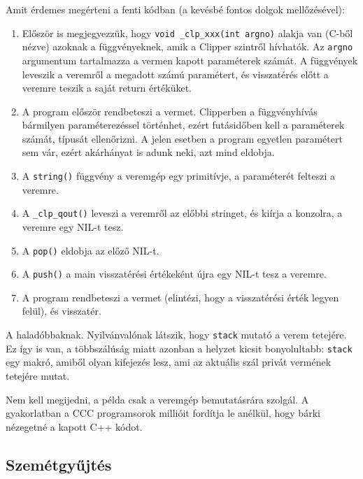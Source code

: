 Amit érdemes megérteni a fenti kódban (a kevésbé fontos dolgok mellőzésével):
\begin{enumerate}
\item 
   Először is megjegyezzük, hogy  \verb!void _clp_xxx(int argno)!
   alakja van (C-ből nézve) azoknak a függvényeknek, amik a Clipper
   szintről hívhatók. Az \verb!argno! argumentum tartalmazza 
   a vermen kapott  paraméterek számát. A függvények leveszik 
   a veremről a megadott számú paramétert, és visszatérés előtt
   a veremre teszik a saját return értéküket.
\item 
   A program először rendbeteszi a vermet. 
   Clipperben a függvényhívás 
   bármilyen paraméterezéssel történhet, ezért futásidőben
   kell a paraméterek számát, típusát ellenőrizni.
   A jelen esetben a program egyetlen paramétert sem vár, 
   ezért akárhányat is adunk neki, azt mind eldobja.
\item 
   A \verb!string()! függvény a veremgép egy primitívje,
   a paraméterét felteszi a veremre.
\item 
   A \verb!_clp_qout()! leveszi a veremről az előbbi stringet,
   és kiírja a konzolra, a veremre egy NIL-t tesz.
\item   
   A \verb!pop()! eldobja az előző NIL-t.
\item   
   A \verb!push()! a main visszatérési értékeként újra egy NIL-t
   tesz a veremre. 
\item   
   A program rendbeteszi a vermet (elintézi,
   hogy a visszatérési érték legyen felül), és visszatér.
\end{enumerate}

A haladóbbaknak.
Nyilvánvalónak látszik, hogy \verb!stack! mutató a verem tetejére.
Ez így is van, a többszálúság miatt azonban a helyzet kicsit
bonyolultabb: \verb!stack! egy makró, amiből olyan kifejezés lesz,
ami az aktuális szál privát vermének tetejére mutat.

Nem kell megijedni, a  példa csak a veremgép
bemutatásrára szolgál. A gyakorlatban  a CCC programsorok millióit 
fordítja le anélkül, hogy bárki nézegetné a kapott C++ kódot.

\subsection{Szemétgyűjtés}

